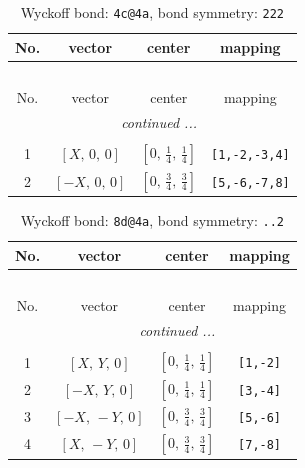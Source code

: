 \documentclass[fleqn,8pt]{jsarticle}
\begin{document}
\renewcommand{\arraystretch}{1.2}
\begin{longtable}{cccc}
\caption{Wyckoff bond: {\tt 4c@4a}, bond symmetry: {\tt 222}}
 \\
 \hline \hline
No. & vector & center & mapping \\ \hline \endfirsthead

\multicolumn{3}{l}{\tablename\ \thetable{}} \\
 \hline \hline
No. & vector & center & mapping \\ \hline \endhead

 \hline \hline
\multicolumn{3}{r}{\footnotesize\it continued ...} \\ \endfoot

 \hline \hline
\multicolumn{3}{r}{} \\ \endlastfoot

1 & $\left[ X,\, 0,\, 0 \right]$ & $\left[ 0,\, \frac{1}{4},\, \frac{1}{4} \right]$ & {\tt [1,-2,-3,4]} \\ \hline
2 & $\left[ - X,\, 0,\, 0 \right]$ & $\left[ 0,\, \frac{3}{4},\, \frac{3}{4} \right]$ & {\tt [5,-6,-7,8]} \\
\end{longtable}
\renewcommand{\arraystretch}{1.2}
\begin{longtable}{cccc}
\caption{Wyckoff bond: {\tt 8d@4a}, bond symmetry: {\tt ..2}}
 \\
 \hline \hline
No. & vector & center & mapping \\ \hline \endfirsthead

\multicolumn{3}{l}{\tablename\ \thetable{}} \\
 \hline \hline
No. & vector & center & mapping \\ \hline \endhead

 \hline \hline
\multicolumn{3}{r}{\footnotesize\it continued ...} \\ \endfoot

 \hline \hline
\multicolumn{3}{r}{} \\ \endlastfoot

1 & $\left[ X,\, Y,\, 0 \right]$ & $\left[ 0,\, \frac{1}{4},\, \frac{1}{4} \right]$ & {\tt [1,-2]} \\ \hline
2 & $\left[ - X,\, Y,\, 0 \right]$ & $\left[ 0,\, \frac{1}{4},\, \frac{1}{4} \right]$ & {\tt [3,-4]} \\ \hline
3 & $\left[ - X,\, - Y,\, 0 \right]$ & $\left[ 0,\, \frac{3}{4},\, \frac{3}{4} \right]$ & {\tt [5,-6]} \\ \hline
4 & $\left[ X,\, - Y,\, 0 \right]$ & $\left[ 0,\, \frac{3}{4},\, \frac{3}{4} \right]$ & {\tt [7,-8]} \\
\end{longtable}
\end{document}

